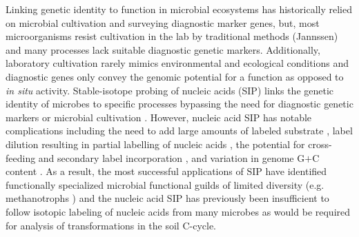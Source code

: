 Linking genetic identity to function in microbial ecosystems has historically
relied on microbial cultivation and surveying diagnostic marker genes, but,
most microorganisms resist cultivation in the lab by traditional methods
(Jannssen) and many processes lack suitable diagnostic genetic markers.
Additionally, laboratory cultivation rarely mimics environmental and ecological
conditions and diagnostic genes only convey the genomic potential for
a function as opposed to \textit{in situ} activity. Stable-isotope probing of
nucleic acids (SIP) links the genetic identity of microbes to specific
processes bypassing the need for diagnostic genetic markers or microbial
cultivation \citep{Chen_Murrell_2010}. However, nucleic acid SIP has notable
complications including the need to add large amounts of labeled substrate
\citep{radajewski2000stable}, label dilution resulting in partial labelling of
nucleic acids \citep{radajewski2000stable,Manefield_2002,McDonald_2005}, the
potential for cross-feeding and secondary label incorporation
\citep{Morris_2002,Hutchens2004,14686943,DeRito2005,McDonald_2005,Ziegler_2005},
and variation in genome G$+$C content
\citep{Buckley_2007,9780408708036,Holben1995,Nusslein1999}. As a result, the
most successful applications of SIP have identified functionally specialized
microbial functional guilds of limited diversity (e.g. methanotrophs
\citep{radajewski2000stable}) and the nucleic acid SIP has previously been
insufficient to follow isotopic labeling of nucleic acids from many microbes as
would be required for analysis of transformations in the soil C-cycle. 

